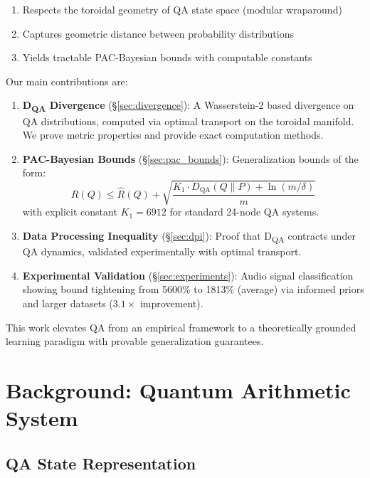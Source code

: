 \documentclass[11pt]{article}
\theoremstyle{remark}
\begin{document}
\begin{enumerate}
    \item Respects the toroidal geometry of QA state space (modular wraparound)
    \item Captures geometric distance between probability distributions
    \item Yields tractable PAC-Bayesian bounds with computable constants
\end{enumerate}

Our main contributions are:

\begin{enumerate}
    \item \textbf{D\textsubscript{QA} Divergence} (\S\ref{sec:divergence}): A Wasserstein-2 based divergence on QA distributions, computed via optimal transport on the toroidal manifold. We prove metric properties and provide exact computation methods.

    \item \textbf{PAC-Bayesian Bounds} (\S\ref{sec:pac_bounds}): Generalization bounds of the form:
    \begin{equation}
    R(Q) \leq \hat{R}(Q) + \sqrt{\frac{K_1 \cdot D_{\text{QA}}(Q \| P) + \ln(m/\delta)}{m}}
    \end{equation}
    with explicit constant $K_1 = 6912$ for standard 24-node QA systems.

    \item \textbf{Data Processing Inequality} (\S\ref{sec:dpi}): Proof that D\textsubscript{QA} contracts under QA dynamics, validated experimentally with optimal transport.

    \item \textbf{Experimental Validation} (\S\ref{sec:experiments}): Audio signal classification showing bound tightening from 5600\% to 1813\% (average) via informed priors and larger datasets ($3.1\times$ improvement).
\end{enumerate}

This work elevates QA from an empirical framework to a theoretically grounded learning paradigm with provable generalization guarantees.

\section{Background: Quantum Arithmetic System}
\label{sec:background}

\subsection{QA State Representation}
\end{document}

